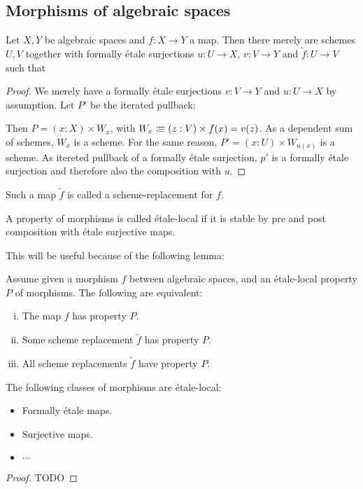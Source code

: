 \subsection{Morphisms of algebraic spaces}

\begin{lemma}
  Let $X,Y$ be algebraic spaces and $f:X\to Y$ a map.
  Then there merely are schemes $U,V$ together with formally étale surjections
  $u:U\to X$, $v:V\to Y$ and $\widetilde{f}:U\to V$ such that
  \begin{center}
  \end{center}
\end{lemma}

\begin{proof}
  We merely have a formally étale surjections $v:V\to Y$ and $u:U\to X$ by assumption.
  Let $P'$ be the iterated pullback:
  \begin{center}
  \end{center}
  Then $P=(x:X)\times W_x$, with $W_x\vcentcolon\mspace{-1.2mu}\equiv (z:V)\times f(x)=v(z)$.
  As a dependent sum of schemes, $W_x$ is a scheme.
  For the same reason, $P'=(x:U)\times W_{u(x)}$ is a scheme.
  As itereted pullback of a formally étale surjection,
  $p'$ is a formally étale surjection and
  therefore also the composition with $u$.
\end{proof}

Such a map $\widetilde{f}$ is called a scheme-replacement for $f$.

\begin{definition}
A property of morphisms is called étale-local if it is stable by pre and post composition with étale surjective maps.
\end{definition}

This will be useful because of the following lemma:

\begin{lemma}
Assume given a morphism $f$ between algebraic spaces, and an étale-local property $P$ of morphisms. The following are equivalent:
\begin{enumerate}[(i)]
\item The map $f$ has property $P$. 
\item Some scheme replacement $\widetilde{f}$ has property $P$. 
\item All scheme replacements $\widetilde{f}$ have property $P$. 
\end{enumerate}
\end{lemma}

\begin{lemma}
The following classes of morphisms are étale-local:
\begin{itemize}
\item Formally étale maps.
\item Surjective maps.
\item $\cdots$
\end{itemize}
\end{lemma}

\begin{proof}
TODO
\end{proof}
